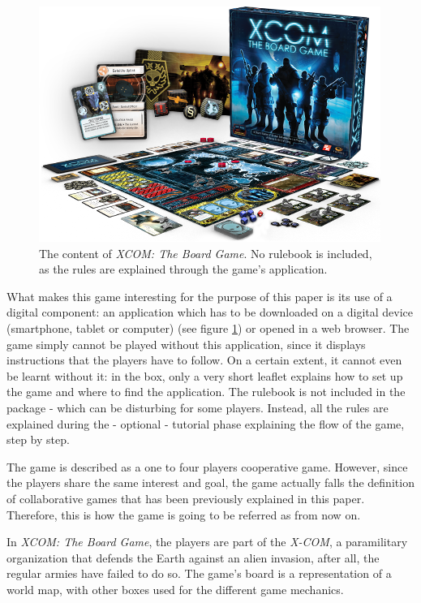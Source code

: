 \begin{figure}[!ht]
    \centering
    \includegraphics[scale=0.5]{Images/xc01_layout.png}
    \caption{The content of \textit{XCOM: The Board Game}. No rulebook is included, as the rules are explained through the game's application.}
    \label{fig:XCOMBG}
\end{figure}

What makes this game interesting for the purpose of this paper is its use of a digital component: an application which has to be downloaded on a digital device (smartphone, tablet or computer) (see figure \ref{fig:XCOMBG}) or opened in a web browser. The game simply cannot be played without this application, since it displays instructions that the players have to follow. On a certain extent, it cannot even be learnt without it: in the box, only a very short leaflet explains how to set up the game and where to find the application. The rulebook is not included in the package - which can be disturbing for some players. Instead, all the rules are explained during the - optional - tutorial phase explaining the flow of the game, step by step. 

The game is described as a one to four players cooperative game. However, since the players share the same interest and goal, the game actually falls the definition of collaborative games that has been previously explained in this paper. Therefore, this is how the game is going to be referred as from now on.

In \textit{XCOM: The Board Game}, the players are part of the \textit{X-COM}, a paramilitary organization that defends the Earth against an alien invasion, after all, the regular armies have failed to do so. The game's board is a representation of a world map, with other boxes used for the different game mechanics.

